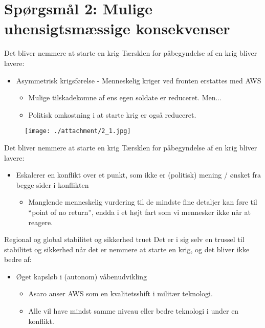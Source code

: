 \section{Spørgsmål 2: Mulige uhensigtsmæssige konsekvenser}

\begin{frame}{Det bliver nemmere at starte en krig}
  Tærsklen for påbegyndelse af en krig bliver lavere:
  \pause
    \begin{itemize}[<+->]
    \item Asymmetrisk krigsførelse - Menneskelig kriger ved fronten
      erstattes med AWS
      \begin{itemize}
      \item Mulige tilskadekomne af ens egen soldate er reduceret. Men...
        \item Politisk omkostning i at starte krig er også reduceret.
        \end{itemize}
      \end{itemize}
      \pause
        \begin{figure}
          \centering
          \texttt{[image: ./attachment/2\_1.jpg]}
        \end{figure}
      \end{frame}

\begin{frame}{Det bliver nemmere at starte en krig}
  Tærsklen for påbegyndelse af en krig bliver lavere:
  \pause
  \begin{itemize}[<+->]
      \item Eskalerer en konflikt over et punkt, som ikke
        er (politisk) mening / ønsket fra begge sider i konflikten
        \begin{itemize}
          \item Manglende menneskelig vurdering til de mindste fine
            detaljer kan føre til ``point of no return'', endda i et
            højt fart som vi mennesker ikke når at reagere.
          \end{itemize}
    \end{itemize}
  \end{frame}

  \begin{frame}{Regional og global stabilitet og sikkerhed truet}
    Det er i sig selv en trussel til stabilitet og sikkerhed når det
    er nemmere at starte en krig, og det bliver ikke bedre af:
    \pause
    \begin{itemize}[<+->]
    \item Øget kapsløb i (autonom) våbenudvikling
      \begin{itemize}
        \item Asaro anser AWS som en kvalitetsshift i militær teknologi.
        \item Alle vil have mindst samme niveau eller bedre teknologi
          i under en konflikt.
        \end{itemize}
      \end{itemize}
    \end{frame}

